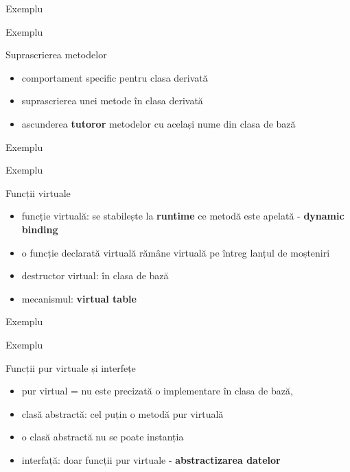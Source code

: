 \documentclass{beamer}
\begin{document}
\begin{frame}{Exemplu}
  \footnotesize{}
\end{frame}   

\begin{frame}{Exemplu}
  \footnotesize{}
\end{frame}

\begin{frame}{Suprascrierea metodelor}
  \begin{itemize}
    \item comportament specific pentru clasa derivată
  	\item suprascrierea unei metode în clasa derivată
	\item ascunderea \textbf{tutoror} metodelor cu același nume din clasa de bază  
  \end{itemize} 
\end{frame}

\begin{frame}{Exemplu}
  \footnotesize{}
\end{frame}

\begin{frame}{Exemplu}
  \footnotesize{}
\end{frame}

\begin{frame}{Funcții virtuale}
  \begin{itemize}
	\item funcție virtuală: se stabilește la \textbf{runtime} ce metodă este apelată - \textbf{dynamic binding}
	\item o funcție declarată virtuală rămâne virtuală pe întreg lanțul de moșteniri
	\item destructor virtual: în clasa de bază
	\item mecanismul: \textbf{virtual table}
  \end{itemize}
\end{frame}

\begin{frame}{Exemplu}
  \footnotesize{}
\end{frame}

\begin{frame}{Exemplu}
  \footnotesize{}
\end{frame}

\begin{frame}{Funcții pur virtuale și interfețe}
  \begin{itemize}
    \item pur virtual = nu este precizată o implementare în clasa de bază,
	\item clasă abstractă: cel puțin o metodă pur virtuală
	\item o clasă abstractă nu se poate instanția 
	\item interfață: doar funcții pur virtuale - \textbf{abstractizarea datelor}
  \end{itemize}
\end{frame}
\end{document}

